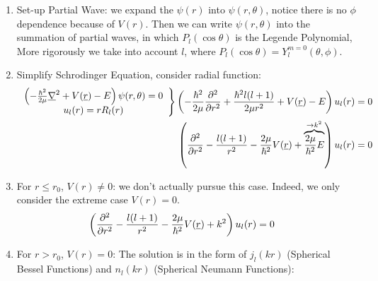 \documentclass{school-22.101-notes}
\begin{document}
\begin{enumerate}
\item Set-up Partial Wave: we expand the $\psi(r)$ into $\psi(r, \theta)$, notice there is no $\phi$ dependence because of $V(r)$. Then we can write $\psi(r,\theta)$ into the summation of partial waves, in which $P_l (\cos \theta)$ is the Legende Polynomial, 
More rigorously we take into account $l$, 
where $P_l (\cos \theta) = Y_l^{m=0} (\theta, \phi)$. 

\item Simplify Schrodinger Equation, consider radial function: 
\begin{align}
\left. \begin{array}{c}
\left(- \frac{\hbar^2}{2 \mu} \underline{\nabla}^2 + V(\underline{r}) - E  \right) \psi(r,\theta) = 0 \\
u_l (r) = r R_l (r) 
\end{array} \right\} 
\left( -\frac{\hbar^2}{2 \mu} \frac{\partial^{2} }{\partial r ^{2}} +\frac{\hbar^2 l(l+1)}{2 \mu r^2} + V(\underline{r}) - E  \right) u_l (r) &= 0 \\
\left( \frac{\partial^{2} }{\partial r ^{2}} - \frac{l(l+1)}{r^2} - \frac{2\mu}{\hbar^2} V(\underline{r}) + \overbrace{\frac{2\mu}{\hbar^2} E}^{\to k^2}  \right) u_l (r) &= 0 
\end{align}

\item For $r\le r_0$, $V(r) \neq 0$: we don't actually pursue this case. Indeed, we only consider the extreme case $V (r) =0$. 
\begin{align}
\left( \frac{\partial^{2} }{\partial r ^{2}} - \frac{l(l+1)}{r^2} - \frac{2\mu}{\hbar^2} V(\underline{r}) + k^2  \right) u_l (r) &= 0 
\end{align}

\item For $r>r_0$, $V(r) =0$: 
The solution is in the form of $j_l (kr)$ (Spherical Bessel Functions) and $n_l (kr)$ (Spherical Neumann Functions):


\end{enumerate}
\end{document}
